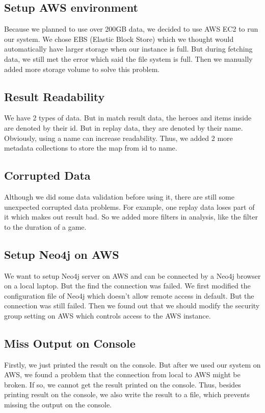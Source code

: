 \documentclass{article}
\begin{document}
\subsection{Setup AWS environment}
Because we planned to use over 200GB data, we decided to use AWS EC2 to run our system. We chose EBS (Elastic Block Store) which we thought would automatically have larger storage when our instance is full. But during fetching data, we still met the error which said the file system is full. Then we manually added more storage volume to solve this problem.
\subsection{Result Readability}
We have 2 types of data. But in match result data, the heroes and items inside are denoted by their id. But in replay data, they are denoted by their name. Obviously, using a name can increase readability. Thus, we added 2 more metadata collections to store the map from id to name.
\subsection{Corrupted Data}
Although we did some data validation before using it, there are still some unexpected corrupted data problems. For example, one replay data loses part of it which makes out result bad. So we added more filters in analysis, like the filter to the duration of a game.
\subsection{Setup Neo4j on AWS}
We want to setup Neo4j server on AWS and can be connected by a Neo4j browser on a local laptop. But the find the connection was failed. We first modified the configuration file of Neo4j which doesn't allow remote access in default. But the connection was still failed. Then we found out that we should modify the security group setting on AWS which controls access to the AWS instance.
\subsection{Miss Output on Console}
Firstly, we just printed the result on the console. But after we used our system on AWS, we found a problem that the connection from local to AWS might be broken. If so, we cannot get the result printed on the console. Thus, besides printing result on the console, we also write the result to a file, which prevents missing the output on the console.
\end{document}
